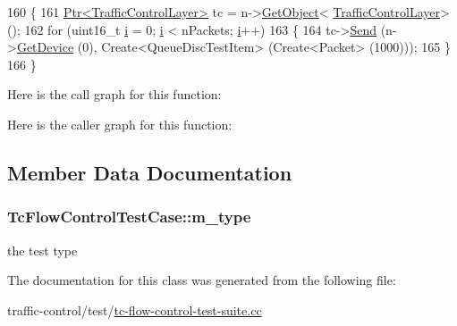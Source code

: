 \begin{DoxyCode}
160 \{
161   \hyperlink{classns3_1_1Ptr}{Ptr<TrafficControlLayer>} tc = n->\hyperlink{classns3_1_1Object_a13e18c00017096c8381eb651d5bd0783}{GetObject}<
      \hyperlink{classns3_1_1TrafficControlLayer}{TrafficControlLayer}> ();
162   \textcolor{keywordflow}{for} (uint16\_t \hyperlink{bernuolliDistribution_8m_a6f6ccfcf58b31cb6412107d9d5281426}{i} = 0; \hyperlink{bernuolliDistribution_8m_a6f6ccfcf58b31cb6412107d9d5281426}{i} < nPackets; \hyperlink{bernuolliDistribution_8m_a6f6ccfcf58b31cb6412107d9d5281426}{i}++)
163     \{
164       tc->\hyperlink{classns3_1_1TrafficControlLayer_aae45cb92c1adb038bac63d347632e627}{Send} (n->\hyperlink{classns3_1_1Node_a5918dfd24ef632efc9a83a5f6561c76e}{GetDevice} (0), Create<QueueDiscTestItem> (Create<Packet> (1000)));
165     \}
166 \}
\end{DoxyCode}


Here is the call graph for this function\+:




Here is the caller graph for this function\+:




\subsection{Member Data Documentation}
\subsubsection[{\texorpdfstring{m\+\_\+type}{m_type}}]{ Tc\+Flow\+Control\+Test\+Case\+::m\+\_\+type\hspace{0.3cm}{\ttfamily [private]}}\hypertarget{classTcFlowControlTestCase_a48b76fa61206d08fadd399b379bdbf56}{}\label{classTcFlowControlTestCase_a48b76fa61206d08fadd399b379bdbf56}


the test type 



The documentation for this class was generated from the following file\+:\begin{DoxyCompactItemize}
\item 
traffic-\/control/test/\hyperlink{tc-flow-control-test-suite_8cc}{tc-\/flow-\/control-\/test-\/suite.\+cc}\end{DoxyCompactItemize}
